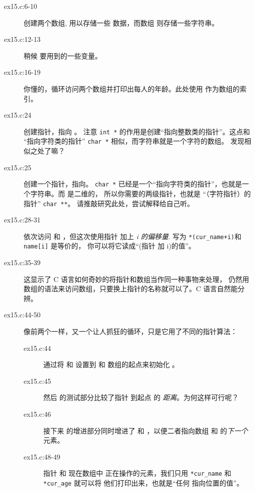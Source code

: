 \begin{description}
\item[ex15.c:6-10] 创建两个数组,  用以存储一些 
    数据，而数组  则存储一些字符串。
\item[ex15.c:12-13] 稍候 要用到的一些变量。
\item[ex15.c:16-19] 你懂的，循环访问两个数组并打印出每人的年龄。此处使用
      作为数组的索引。
\item[ex15.c:24] 创建指针，指向 。
    注意 \verb|int *| 的作用是创建“指向整数类的指针”。这点和
    “指向字符类的指针” \verb|char *| 相似，而字符串就是一个字符的数组。
    发现相似之处了嘛？
\item[ex15.c:25] 创建一个指针，指向。 \verb|char *| 
    已经是一个“指向字符类的指针”，也就是一个字符串。而  是二维的，
    所以你需要的两级指针，也就是 “（字符指针）的指针” \verb|char **|。
    请推敲研究此处，尝试解释给自己听。
\item[ex15.c:28-31] 依次访问  和 ，但这次使用指针
    加上 \emph{i 的偏移量}.  写为 \verb|*(cur_name+i)|和\verb|name[i]| 是等价的，
    你可以将它读成“(指针  加 i)的值”。
\item[ex15.c:35-39] 这显示了 C 语言如何奇妙的将指针和数组当作同一种事物来处理，
    仍然用数组的语法来访问数组，只要换上指针的名称就可以了。C 语言自然能分辨。
\item[ex15.c:44-50] 像前两个一样，又一个让人抓狂的循环，只是它用了不同的指针算法：
    \begin{description}
    \item[ex15.c:44] 通过将  和  设置到
         和  数组的起点来初始化 。
    \item[ex15.c:45] 然后  的测试部分比较了指针 
        到起点  的 \emph{距离}。为何这样可行呢？
    \item[ex15.c:46] 接下来  的增进部分同时增进了
         和 ，以便二者指向数组
         和  的\emph{下一个}元素。
    \item[ex15.c:48-49] 指针  和  现在数组中
        正在操作的元素，我们只用 \verb|*cur_name| 和 \verb|*cur_age| 就可以将
        他们打印出来，也就是“任何  指向位置的值”。
    \end{description}
\end{description}

